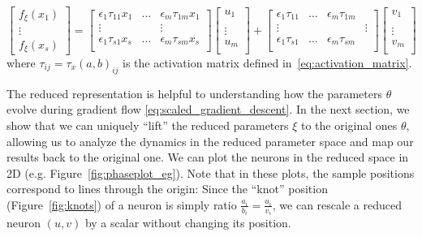 \begin{equation}
    \begin{bmatrix}
        f_\xi(x_1)\\
        \vdots\\
        f_\xi(x_s)
    \end{bmatrix}
    =
    \begin{bmatrix}
        \epsilon_1\tau_{11} x_1 & \ldots & \epsilon_m\tau_{1m} x_1\\
        \vdots & &  \vdots \\
        \epsilon_1 \tau_{s1} x_s & \ldots & \epsilon_m \tau_{sm}
        x_s\\
    \end{bmatrix}
    \begin{bmatrix} 
        u_1\\\\
        \vdots\\
        u_m\\
    \end{bmatrix}
    + 
        \begin{bmatrix}
        \epsilon_1\tau_{11} & \ldots & \epsilon_m\tau_{1m}\\
        \vdots & & &  \vdots \\
        \epsilon_1 \tau_{s1} & \ldots & \epsilon_m \tau_{sm}
        \\
    \end{bmatrix}
    \begin{bmatrix} 
        v_1\\\\
        \vdots\\
        v_m\\
    \end{bmatrix}
\end{equation}
where $\tau_{ij} = \tau_x(a, b)_{ij}$ is the activation matrix defined in~\eqref{eq:activation_matrix}. 

The reduced representation is helpful to understanding how the parameters $\theta$ evolve during gradient flow \eqref{eq:scaled_gradient_descent}. In the next section, we show that we can uniquely ``lift'' the reduced parameters $\xi$ to the original ones $\theta$, allowing us to analyze the dynamics in the reduced parameter space and map our results back to the original one. We can plot the neurons in the reduced space in 2D (e.g. Figure~\ref{fig:phaseplot_eg}). Note that in these plots, the sample positions correspond to lines through the origin: Since the ``knot'' position (Figure~\ref{fig:knots}) of a neuron is simply ratio $\frac{a_i}{b_i} = \frac{u_i}{v_i}$, we can rescale a reduced neuron $(u, v)$ by a scalar without changing its position.







